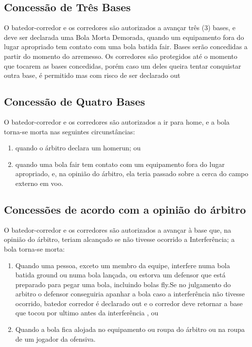\begin{enumerate}[label=\roman*.]
\subsection{Concessão de Três Bases}

		 O batedor-corredor e os corredores são autorizados a avançar três (3) bases, e deve ser declarada uma Bola Morta Demorada, quando um equipamento fora do lugar apropriado tem contato com uma bola batida \gls{fair}. Bases serão concedidas a partir do momento do arremesso. Os corredores são protegidos até o momento que tocarem as bases concedidas, porém caso um deles queira tentar conquistar outra base, é permitido mas com risco de ser declarado \gls{out}

\subsection{Concessão de Quatro Bases}

		 O batedor-corredor e os corredores são autorizados a ir para \gls{home}, e a bola torna-se morta nas seguintes circunstâncias:

		\begin{enumerate}[label=\roman*.]
		\item quando o árbitro declara um \gls{homerun}; ou
		\item quando uma bola \gls{fair} tem contato com um equipamento fora do lugar apropriado, e, na opinião do árbitro, ela teria passado sobre a cerca do campo externo em voo.
	\end{enumerate}

\subsection{Concessões de acordo com a opinião do árbitro}

O batedor-corredor e os corredores são autorizados a avançar à base que, na opinião do árbitro, teriam alcançado se não tivesse ocorrido a Interferência; a bola torna-se morta:

 \begin{enumerate}[label=\roman*.]
 	\item Quando uma pessoa, exceto um membro da equipe, interfere numa bola batida \gls{ground} ou numa bola lançada, ou estorva um defensor que está preparado para pegar uma bola, incluindo bolas \gls{fly}.Se no julgamento do arbitro o defensor conseguiria apanhar a bola caso a interferência não tivesse ocorrido, batedor corredor é declarado out e o corredor deve retornar a base que tocou por ultimo antes da interferência , ou
\item  Quando a bola fica alojada no equipamento ou roupa do árbitro ou na roupa de um jogador da ofensiva.
\end{enumerate}
\end{enumerate}


